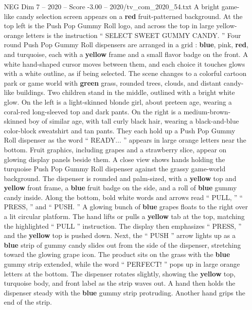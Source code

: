 \begin{textsample}{NEG Dim 7 – 2020 – Score -3.00 – 2020/tv\_com\_2020\_54.txt}  \label{ex:f7_neg_016}
A bright game-like candy selection screen appears on a \textbf{red} fruit-patterned background.
At the top left is the Push Pop Gummy Roll logo, and across the top in large yellow-orange letters is the instruction “ SELECT SWEET GUMMY CANDY. ” Four round Push Pop Gummy Roll dispensers are arranged in a grid : \textbf{blue}, pink, \textbf{red}, and turquoise, each with a \textbf{yellow} frame and a small flavor badge on the front.
A white hand-shaped cursor moves between them, and each choice it touches glows with a white outline, as if being selected.
The scene changes to a colorful cartoon park or game world with \textbf{green} grass, rounded trees, clouds, and distant candy-like buildings.
Two children stand in the middle, outlined with a bright white glow.
On the left is a light-skinned blonde girl, about preteen age, wearing a coral-red long-sleeved top and dark pants.
On the right is a medium-brown-skinned boy of similar age, with tall curly black hair, wearing a black-and-blue color-block sweatshirt and tan pants.
They each hold up a Push Pop Gummy Roll dispenser as the word “ READY... ” appears in large orange letters near the bottom.
Fruit graphics, including grapes and a strawberry slice, appear on glowing display panels beside them.
A close view shows hands holding the turquoise Push Pop Gummy Roll dispenser against the grassy game-world background.
The dispenser is rounded and palm-sized, with a \textbf{yellow} top and \textbf{yellow} front frame, a \textbf{blue} fruit badge on the side, and a roll of \textbf{blue} gummy candy inside.
Along the bottom, bold white words and arrows read “ PULL, ” “ PRESS, ” and “ PUSH. ” A glowing bunch of \textbf{blue} grapes floats to the right over a lit circular platform.
The hand lifts or pulls a \textbf{yellow} tab at the top, matching the highlighted “ PULL ” instruction.
The display then emphasizes “ PRESS, ” and the \textbf{yellow} top is pushed down.
Next, the “ PUSH ” arrow lights up as a \textbf{blue} strip of gummy candy slides out from the side of the dispenser, stretching toward the glowing grape icon.
The product sits on the grass with the \textbf{blue} gummy strip extended, while the word “ PERFECT! ” pops up in large orange letters at the bottom.
The dispenser rotates slightly, showing the \textbf{yellow} top, turquoise body, and front label as the strip waves out.
A hand then holds the dispenser steady with the \textbf{blue} gummy strip protruding.
Another hand grips the end of the strip.

\end{textsample}
